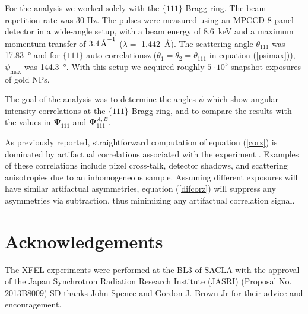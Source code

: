 \documentclass [12pt,fleqn]{article}
\newcommand{\angstrom}{\textup{\AA}}
\begin{document}
For the analysis we worked solely with the $\{111\}$ Bragg ring. The beam repetition rate was 30 Hz. The pulses were measured using an MPCCD 8-panel detector in a wide-angle setup, with a beam energy of \SI{8.6}{\kilo \electronvolt} and a maximum momentum transfer of $3.4 \, \angstrom^{-1}$ ($\lambda = $ \SI{1.442}{\angstrom}). The scattering angle $\theta_{111}$ was \SI{17.83}{\degree} and for $\{111\}$ auto-correlationsz ($\theta_1 = \theta_2 = \theta_{111}$ in equation (\ref{psimax})), $\psi_{\max}$ was \SI{144.3}{\degree}. With this setup we acquired roughly $5 \cdot 10^5$ snapshot exposures of gold NPs. 

The goal of the analysis was to determine the angles $\psi$ which show angular intensity correlations at the $\{111\}$ Bragg ring, and to compare the results with the values in $\bm {\Psi}_{111}$ and $\bm \Psi^{A,B}_{111}$.

As previously reported, straightforward computation of equation (\ref{corz}) is dominated by artifactual correlations associated with the experiment \cite{mendez2014observation}. Examples of these correlations include pixel cross-talk, detector shadows, and scattering anisotropies due to an inhomogeneous sample.  Assuming different exposures will have similar artifactual asymmetries,  equation (\ref{difcorz}) will suppress any asymmetries via subtraction, thus minimizing any artifactual correlation signal.

\section*{Acknowledgements}
The XFEL experiments were performed at the BL3 of SACLA with the approval of the Japan Synchrotron Radiation Research Institute (JASRI) (Proposal No. 2013B8009)
SD thanks  John Spence and Gordon J. Brown Jr for their advice and encouragement.

%
%
\end{document}
